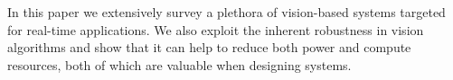 In this paper we extensively survey a plethora of vision-based systems 
targeted for real-time applications. We also exploit the inherent robustness 
in vision algorithms and show that it can help to reduce both 
power and compute resources, both of which are valuable when designing systems.
